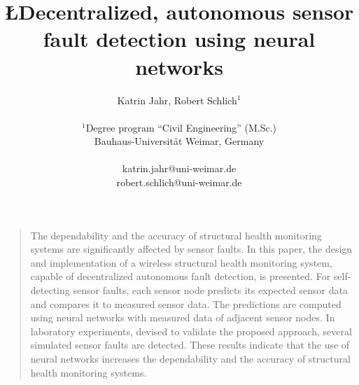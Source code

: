 \documentclass[12pt]{article}
\title{\textbf{ \L{Decentralized, autonomous sensor fault detection using neural networks}} }
\author
{Katrin Jahr, Robert Schlich$^{1}$\\
\\
\normalsize{$^{1}$Degree program “Civil Engineering” (M.Sc.)}\\
\normalsize{Bauhaus-Universität Weimar, Germany}\\
\\
\normalsize{katrin.jahr@uni-weimar.de}\\
\normalsize{robert.schlich@uni-weimar.de}
}
\date{}
\newenvironment{sciabstract}{%
\begin{quote} \bf}
{\end{quote}}
\begin{document}
 


\baselineskip24pt


\maketitle 




\begin{sciabstract}


The dependability and the accuracy of structural health monitoring systems are significantly affected by sensor faults. 
In this paper, the design and implementation of a wireless structural health monitoring system, capable of decentralized autonomous fault detection, is presented. 
For self-detecting sensor faults, each sensor node predicts its expected sensor data and compares it to measured sensor data. 
The predictions are computed using neural networks with measured data of adjacent sensor nodes.
In laboratory experiments, devised to validate the proposed approach, several simulated sensor faults are detected.
These results indicate that the use of neural networks increases the dependability and the accuracy of structural health monitoring systems.





\end{sciabstract}
\end{document}
